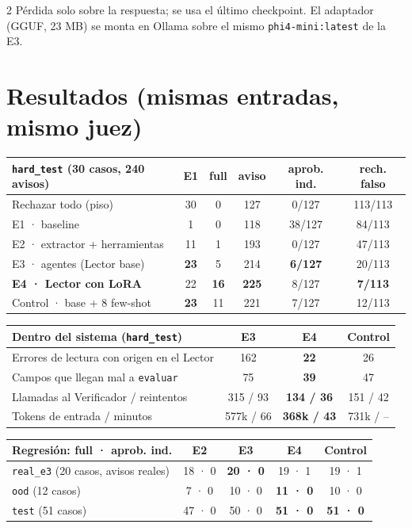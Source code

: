 \documentclass[9pt,a4paper]{extarticle}
\newcommand{\cod}[1]{\texttt{#1}}
\begin{document}
\begin{multicols}{2}
Pérdida solo sobre la respuesta; se usa el último checkpoint. El adaptador (GGUF, 23 MB) se monta en Ollama sobre el mismo \cod{phi4-mini:latest} de la E3.

\section{Resultados (mismas entradas, mismo juez)}
{\scriptsize
\begin{tabularx}{\columnwidth}{@{}Xccccc@{}}
\toprule
\cod{hard\_test} (30 casos, 240 avisos) & E1 & full & aviso & aprob. ind. & rech. falso\\
\midrule
Rechazar todo (piso) & 30 & 0 & 127 & 0/127 & 113/113\\
E1 · baseline & 1 & 0 & 118 & 38/127 & 84/113\\
E2 · extractor + herramientas & 11 & 1 & 193 & 0/127 & 47/113\\
E3 · agentes (Lector base) & \textbf{23} & 5 & 214 & \textbf{6/127} & 20/113\\
\textbf{E4 · Lector con LoRA} & 22 & \textbf{16} & \textbf{225} & 8/127 & \textbf{7/113}\\
Control · base + 8 few-shot & \textbf{23} & 11 & 221 & 7/127 & 12/113\\
\bottomrule
\end{tabularx}

\begin{tabularx}{\columnwidth}{@{}Xccc@{}}
\toprule
Dentro del sistema (\cod{hard\_test}) & E3 & \textbf{E4} & Control\\
\midrule
Errores de lectura con origen en el Lector & 162 & \textbf{22} & 26\\
Campos que llegan mal a \cod{evaluar} & 75 & \textbf{39} & 47\\
Llamadas al Verificador / reintentos & 315 / 93 & \textbf{134 / 36} & 151 / 42\\
Tokens de entrada / minutos & 577k / 66 & \textbf{368k / 43} & 731k / --\\
\bottomrule
\end{tabularx}

\begin{tabularx}{\columnwidth}{@{}Xcccc@{}}
\toprule
Regresión: full · aprob. ind. & E2 & E3 & \textbf{E4} & Control\\
\midrule
\cod{real\_e3} (20 casos, avisos reales) & 18 · 0 & \textbf{20 · 0} & 19 · 1 & 19 · 1\\
\cod{ood} (12 casos) & 7 · 0 & 10 · 0 & \textbf{11 · 0} & 10 · 0\\
\cod{test} (51 casos) & 47 · 0 & 50 · 0 & \textbf{51 · 0} & \textbf{51 · 0}\\
\bottomrule
\end{tabularx}}


\end{multicols}
\end{document}
